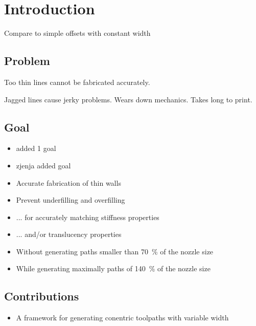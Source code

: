\section{Introduction}

Compare to simple offsets with constant width

\subsection{Problem}
Too thin lines cannot be fabricated accurately.


Jagged lines cause jerky problems.
Wears down mechanics.
Takes long to print.



\subsection{Goal}
\begin{itemize}
\item added 1 goal
\item zjenja added goal
\item Accurate fabrication of thin walls
\item Prevent underfilling and overfilling
\item ... for accurately matching stiffness properties
\item ... and/or translucency properties
\item Without generating paths smaller than \SI{70}{\percent} of the nozzle size
\item While generating maximally paths of \SI{140}{\percent} of the nozzle size
\end{itemize}



\subsection{Contributions}
\begin{itemize}
\item A framework for generating conentric toolpaths with variable width
\end{itemize}
